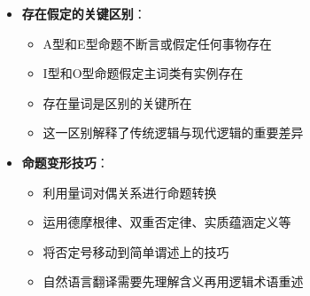 \begin{center}
{{\begin{itemize}
  \begin{itemize}
  \item A与O、E与I构成矛盾关系（一真一假）
  \item A命题不必然蕴涵I命题（当主词类为空时）
  \item 空类问题：人首马身怪物的例子说明了存在假定的重要性
  \item 传统对当方阵在现代逻辑中的修正
  \end{itemize}
\item \textbf{存在假定的关键区别}：
  \begin{itemize}
  \item A型和E型命题不断言或假定任何事物存在
  \item I型和O型命题假定主词类有实例存在
  \item 存在量词是区别的关键所在
  \item 这一区别解释了传统逻辑与现代逻辑的重要差异
  \end{itemize}
\item \textbf{命题变形技巧}：
  \begin{itemize}
  \item 利用量词对偶关系进行命题转换
  \item 运用德摩根律、双重否定律、实质蕴涵定义等
  \item 将否定号移动到简单谓述上的技巧
  \item 自然语言翻译需要先理解含义再用逻辑术语重述
  \end{itemize}
\end{itemize}
}}
\end{center}
